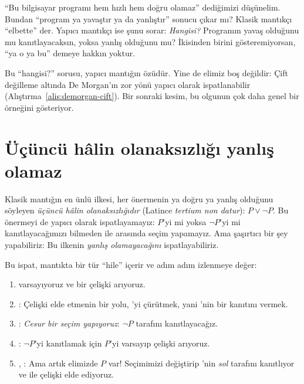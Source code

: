 \begin{gunlukornek}
``Bu bilgisayar programı hem hızlı hem doğru olamaz'' dediğimizi
düşünelim. Bundan ``program ya yavaştır ya da yanlıştır'' sonucu çıkar
mı? Klasik mantıkçı ``elbette'' der. Yapıcı mantıkçı ise şunu sorar:
\emph{Hangisi?} Programın yavaş olduğunu mu kanıtlayacaksın, yoksa yanlış
olduğunu mu? İkisinden birini gösteremiyorsan, ``ya o ya bu'' demeye
hakkın yoktur.
\end{gunlukornek}

Bu ``hangisi?'' sorusu, yapıcı mantığın özüdür. Yine de elimiz boş
değildir: Çift değilleme altında De Morgan'ın zor yönü yapıcı olarak
ispatlanabilir (Alıştırma~\ref{alis:demorgan-cift}). Bir sonraki kesim,
bu olgunun çok daha genel bir örneğini gösteriyor.

\section{Üçüncü hâlin olanaksızlığı yanlış olamaz}\label{sec:em-yanlis-olamaz}

Klasik mantığın en ünlü ilkesi, her önermenin ya doğru ya yanlış
olduğunu söyleyen \emph{üçüncü hâlin olanaksızlığıdır} (Latince
\emph{tertium non datur}): $P \vee \neg P$. Bu önermeyi de yapıcı olarak
ispatlayamayız: $P$'yi mi yoksa $\neg P$'yi mi kanıtlayacağımızı bilmeden
 ile  arasında seçim yapamayız. Ama şaşırtıcı bir
şey yapabiliriz: Bu ilkenin \emph{yanlış olamayacağını} ispatlayabiliriz.


Bu ispat, mantıkta bir tür ``hile'' içerir ve adım adım izlenmeye değer:

\begin{enumerate}[adimlar]
  \item {} varsayıyoruz ve bir çelişki arıyoruz.
  \item {}: Çelişki elde etmenin bir yolu, 'yi
        çürütmek, yani 'nin bir kanıtını vermek.
  \item {}: \emph{Cesur bir seçim yapıyoruz}:
        $\neg P$ tarafını kanıtlayacağız.
  \item {}: $\neg P$'yi kanıtlamak için $P$'yi varsayıp
        çelişki arıyoruz.
  \item {}, : Ama artık elimizde
        $P$ var! Seçimimizi değiştirip 'nin \emph{sol}
        tarafını kanıtlıyor ve  ile çelişki elde ediyoruz.
\end{enumerate}

